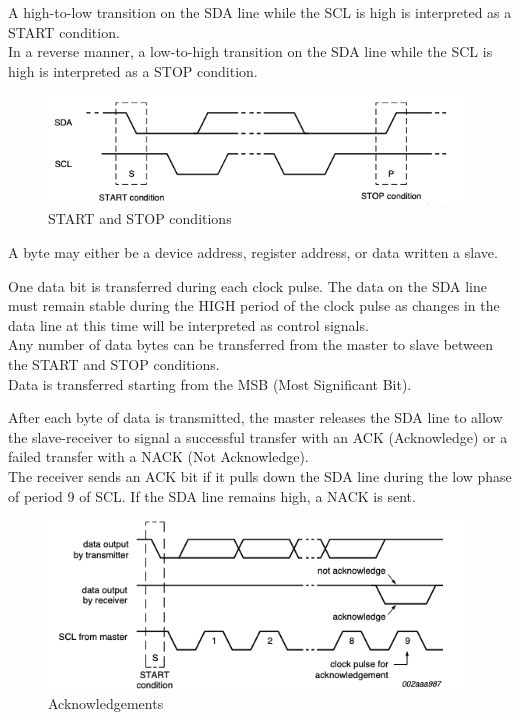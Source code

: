 \documentclass[a4paper, 12pt]{article}
\begin{document}
A high-to-low transition on the SDA line while the SCL is high is interpreted as a START condition. \\
In a reverse manner, a low-to-high transition on the SDA line while the SCL is high is interpreted as a STOP condition.

\begin{figure}[h]
    \includegraphics[width=11cm]{start_stop_conds}
    \centering
    \caption{START and STOP conditions}
\end{figure}

A byte may either be a device address, register address, or data written a slave.

One data bit is transferred during each clock pulse. The data on the SDA line must remain stable during the HIGH period of the clock pulse as changes in the data line at this time will be interpreted as control signals. \\
Any number of data bytes can be transferred from the master to slave between the START and STOP conditions. \\
Data is transferred starting from the MSB (Most Significant Bit).

After each byte of data is transmitted, the master releases the SDA line to allow the slave-receiver to signal a successful transfer with an ACK (Acknowledge) or a failed transfer with a NACK (Not Acknowledge). \\
The receiver sends an ACK bit if it pulls down the SDA line during the low phase of period 9 of SCL. If the SDA line remains high, a NACK is sent.

\begin{figure}[h]
    \includegraphics[width=11cm]{ACK_NACK}
    \centering
    \caption{Acknowledgements}
\end{figure}
\end{document}
